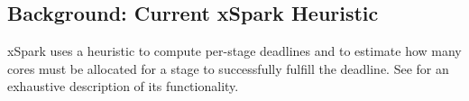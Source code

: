 \subsection{Background: Current xSpark Heuristic}\label{sec:impl_background}

xSpark uses a heuristic to compute per-stage deadlines and to estimate how many cores must be allocated for a stage to successfully fulfill the deadline. See  for an exhaustive description of its functionality.



